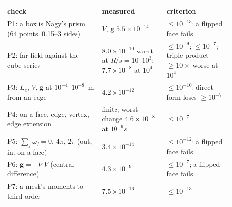 \begin{tabular}{>{\raggedright}p{0.38\linewidth}>{\raggedright}p{0.26\linewidth}>{\raggedright\arraybackslash}p{0.26\linewidth}}\toprule
check & measured & criterion\\\midrule
P1: a box is Nagy's prism (64 points, 0.15--3 sides) & $V$, $\mathbf{g}$ $5.5\times10^{-14}$ & $\le10^{-13}$; a flipped face fails\\
P2: far field against the cube series & $8.0\times10^{-10}$ worst at $R/s=10$--$10^3$; $7.7\times10^{-8}$ at $10^4$ & $\le10^{-9}$; $\le10^{-7}$; triple product $\ge10\times$ worse at $10^4$\\
P3: $L_e$, $V$, $\mathbf{g}$ at $10^{-4}$--$10^{-8}$~m from an edge & $4.2\times10^{-12}$ & $\le10^{-10}$; direct form loses $\ge10^{-7}$\\
P4: on a face, edge, vertex, edge extension & finite; worst change $4.6\times10^{-8}$ at $10^{-9}s$ & $\le10^{-7}$\\
P5: $\sum_f\omega_f = 0$, $4\pi$, $2\pi$ (out, in, on a face) & $3.4\times10^{-14}$ & $\le10^{-12}$; a flipped face fails\\
P6: $\mathbf{g} = -\nabla V$ (central difference) & $4.3\times10^{-9}$ & $\le10^{-7}$; a flipped face fails\\
P7: a mesh's moments to third order & $7.5\times10^{-16}$ & $\le10^{-13}$\\\bottomrule
\end{tabular}
